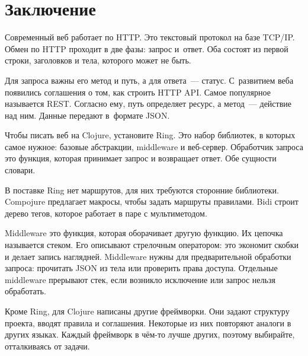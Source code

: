 \section{Заключение}

Современный веб работает по HTTP. Это текстовый протокол на базе TCP/IP. Обмен
по HTTP проходит в две фазы: запрос и~ответ. Оба состоят из первой строки,
заголовков и тела, которого может не быть.

Для запроса важны его метод и путь, а для ответа~--- статус. С~развитием веба
появились соглашения о том, как строить HTTP API. Самое популярное называется
REST. Согласно ему, путь определяет ресурс, а метод~--- действие над ним. Данные
передают в~формате JSON.

Чтобы писать веб на Clojure, установите Ring. Это набор библиотек, в которых
самое нужное: базовые абстракции, middleware и веб-сервер. Обработчик запроса
это функция, которая принимает запрос и возвращает ответ. Обе сущности словари.

В поставке Ring нет маршрутов, для них требуются сторонние библиотеки. Compojure
предлагает макросы, чтобы задать маршруты правилами. Bidi строит дерево тегов,
которое работает в паре с мультиметодом.

Middleware это функция, которая оборачивает другую функцию. Их цепочка
называется стеком. Его описывают стрелочным оператором: это экономит скобки и
делает запись наглядней. Middleware нужны для предварительной обработки запроса:
прочитать JSON из тела или проверить права доступа. Отдельные middleware
прерывают стек, если возникло исключение или запрос нельзя обработать.

Кроме Ring, для Clojure написаны другие фреймворки. Они задают структуру
проекта, вводят правила и соглашения. Некоторые из них повторяют аналоги в
других языках. Каждый фреймворк в чём-то лучше других, поэтому выбирайте,
отталкиваясь от задачи.
